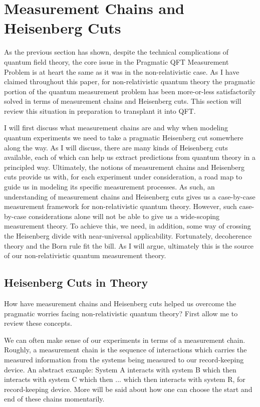 \documentclass[12pt,prd,superscriptaddress,floatfix,amsmath,amssymb,amsfonts,nofootinbib]{revtex4-2}
\begin{document}
\section{Measurement Chains and Heisenberg Cuts}\label{ChainsAndCuts}
As the previous section has shown, despite the technical complications of quantum field theory, the core issue in the Pragmatic QFT Measurement Problem is at heart the same as it was in the non-relativistic case. As I have claimed throughout this paper, for non-relativistic quantum theory the pragmatic portion of the quantum measurement problem has been more-or-less satisfactorily solved in terms of measurement chains and Heisenberg cuts. This section will review this situation in preparation to transplant it into QFT.

I will first discuss what measurement chains are and why when modeling quantum experiments we need to take a pragmatic Heisenberg cut somewhere along the way. As I will discuss, there are many kinds of Heisenberg cuts available, each of which can help us extract predictions from quantum theory in a principled way. Ultimately, the notions of measurement chains and Heisenberg cuts provide us with, for each experiment under consideration, a road map to guide us in modeling its specific measurement processes. As such, an understanding of measurement chains and Heisenberg cuts gives us a case-by-case measurement framework for non-relativistic quantum theory. However, such case-by-case considerations alone will not be able to give us a wide-scoping measurement theory. To achieve this, we need, in addition, some way of crossing the Heisenberg divide with near-universal applicability. Fortunately, decoherence theory and the Born rule fit the bill. As I will argue, ultimately this is the source of our non-relativistic quantum measurement theory.

\subsection{Heisenberg Cuts in Theory}
How have measurement chains and Heisenberg cuts helped us overcome the pragmatic worries facing non-relativistic quantum theory? First allow me to review these concepts.

We can often make sense of our experiments in terms of a measurement chain. Roughly, a measurement chain is the sequence of interactions which carries the measured information from the systems being measured to our record-keeping device. An abstract example: System A interacts with system B which then interacts with system C which then ... which then interacts with system R, for record-keeping device. More will be said about how one can choose the start and end of these chains momentarily.
\end{document}

